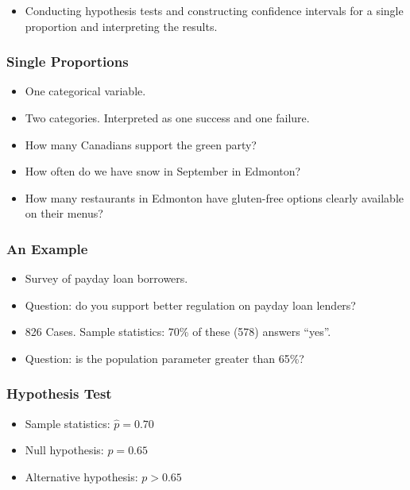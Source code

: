 \documentclass{beamer}
\begin{document}
\begin{frame}
  \begin{itemize}
    \item[] 
      Conducting hypothesis tests and constructing confidence
      intervals for a single proportion and interpreting the results.
  \end{itemize}
\end{frame}


\begin{frame}
  \frametitle{Single Proportions}
  \begin{itemize}
    \item[] 
      One categorical variable.
      \vspace{0.5cm}
    \item[] 
      Two categories. Interpreted as one success and one failure. 
      \vspace{0.5cm}
    \item[] 
      How many Canadians support the green party?
      \vspace{0.5cm}
    \item[] 
      How often do we have snow in September in Edmonton?
      \vspace{0.5cm}
    \item[] 
      How many restaurants in Edmonton have gluten-free options
      clearly available on their menus?
  \end{itemize}
\end{frame}

\begin{frame}
  \frametitle{An Example}
  \begin{itemize}
    \item[] 
      Survey of payday loan borrowers. 
      \vspace{0.5cm}
    \item[] 
      Question: do you support better regulation on payday loan
      lenders?
      \vspace{0.5cm}
    \item[] 
      826 Cases. Sample statistics: 70\% of these (578) answers
      ``yes''. 
      \vspace{0.5cm}
    \item[] 
      Question: is the population parameter greater than 65\%?
  \end{itemize}
\end{frame}

\begin{frame}
  \frametitle{Hypothesis Test}
  \begin{itemize}
    \item[] 
      Sample statistics: $\hat{p}= 0.70$
      \vspace{0.5cm}
    \item[] 
      Null hypothesis: $p = 0.65$
      \vspace{0.5cm}
    \item[] 
      Alternative hypothesis: $p > 0.65$
  \end{itemize}
\end{frame}
\end{document}
